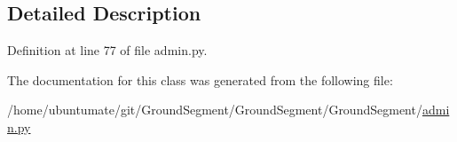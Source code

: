 \subsection{Detailed Description}


Definition at line 77 of file admin.\+py.



The documentation for this class was generated from the following file\+:\begin{DoxyCompactItemize}
\item 
/home/ubuntumate/git/\+Ground\+Segment/\+Ground\+Segment/\+Ground\+Segment/\hyperlink{admin_8py}{admin.\+py}\end{DoxyCompactItemize}
